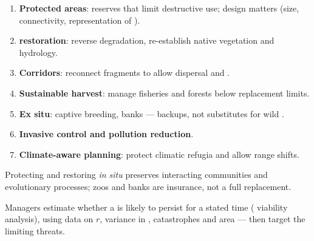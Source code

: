 \begin{method}
\label{met:g12:populations-conservation:tools}
\begin{enumerate}
  \item \textbf{Protected areas}: reserves that limit destructive use;
        design matters (size, connectivity, representation of ).
  \item \textbf{ restoration}: reverse degradation, re-establish
        native vegetation and hydrology.
  \item \textbf{Corridors}: reconnect fragments to allow dispersal and
        .
  \item \textbf{Sustainable harvest}: manage fisheries and forests below
        replacement limits.
  \item \textbf{Ex situ}: captive breeding,  banks --- backups, not
        substitutes for wild .
  \item \textbf{Invasive control and pollution reduction}.
  \item \textbf{Climate-aware planning}: protect climatic refugia and
        allow range shifts.
\end{enumerate}
\end{method}

\begin{proposition}
\label{prop:g12:populations-conservation:insitu}
Protecting and restoring  \emph{in situ} preserves interacting
communities and evolutionary processes; zoos and banks are insurance,
not a full replacement.
\end{proposition}
\admitted

\begin{example}
\label{ex:g12:populations-conservation:pva}
Managers estimate whether a  is likely to persist for a stated
time ( viability analysis), using data on $r$, variance in
, catastrophes and  area --- then target the limiting
threats.
\end{example}

